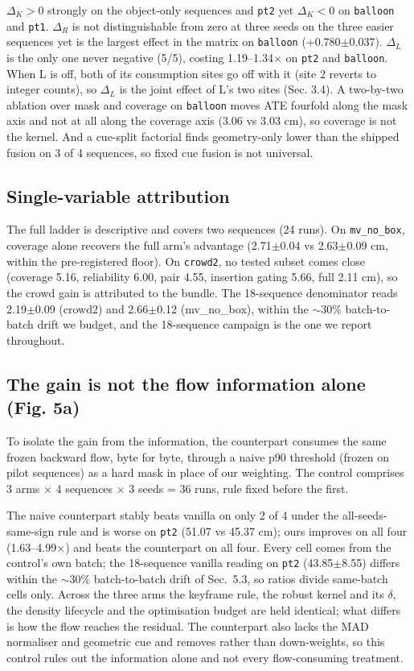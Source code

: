 $\Delta_K > 0$ strongly on the object-only sequences and \texttt{pt2} yet $\Delta_K < 0$ on \texttt{balloon} and \texttt{pt1}. $\Delta_R$ is not distinguishable from zero at three seeds on the three easier sequences yet is the largest effect in the matrix on \texttt{balloon} (+0.780$\pm$0.037). $\Delta_L$ is the only one never negative (5/5), costing 1.19--1.34$\times$ on \texttt{pt2} and \texttt{balloon}. When L is off, both of its consumption sites go off with it (site 2 reverts to integer counts), so $\Delta_L$ is the joint effect of L's two sites (Sec. 3.4). A two-by-two ablation over mask and coverage on \texttt{balloon} moves ATE fourfold along the mask axis and not at all along the coverage axis (3.06 vs 3.03 cm), so coverage is not the kernel. And a cue-split factorial finds geometry-only lower than the shipped fusion on 3 of 4 sequences, so fixed cue fusion is not universal.


\subsection{Single-variable attribution}


The full ladder is descriptive and covers two sequences (24 runs). On \texttt{mv\_no\_box}, coverage alone recovers the full arm's advantage (2.71$\pm$0.04 vs 2.63$\pm$0.09 cm, within the pre-registered floor). On \texttt{crowd2}, no tested subset comes close (coverage 5.16, reliability 6.00, pair 4.55, insertion gating 5.66, full 2.11 cm), so the crowd gain is attributed to the bundle. The 18-sequence denominator reads 2.19$\pm$0.09 (crowd2) and 2.66$\pm$0.12 (mv\_no\_box), within the $\sim$30\% batch-to-batch drift we budget, and the 18-sequence campaign is the one we report throughout.


\subsection{The gain is not the flow information alone (Fig. 5a)}


To isolate the gain from the information, the counterpart consumes the same frozen backward flow, byte for byte, through a naive p90 threshold (frozen on pilot sequences) as a hard mask in place of our weighting. The control comprises 3 arms $\times$ 4 sequences $\times$ 3 seeds = 36 runs, rule fixed before the first.


The naive counterpart stably beats vanilla on only 2 of 4 under the all-seeds-same-sign rule and is worse on \texttt{pt2} (51.07 vs 45.37 cm); ours improves on all four (1.63--4.99$\times$) and beats the counterpart on all four. Every cell comes from the control's own batch; the 18-sequence vanilla reading on \texttt{pt2} (43.85$\pm$8.55) differs within the $\sim$30\% batch-to-batch drift of Sec.~5.3, so ratios divide same-batch cells only. Across the three arms the keyframe rule, the robust kernel and its $\delta$, the density lifecycle and the optimisation budget are held identical; what differs is how the flow reaches the residual. The counterpart also lacks the MAD normaliser and geometric cue and removes rather than down-weights, so this control rules out the information alone and not every flow-consuming treatment.


